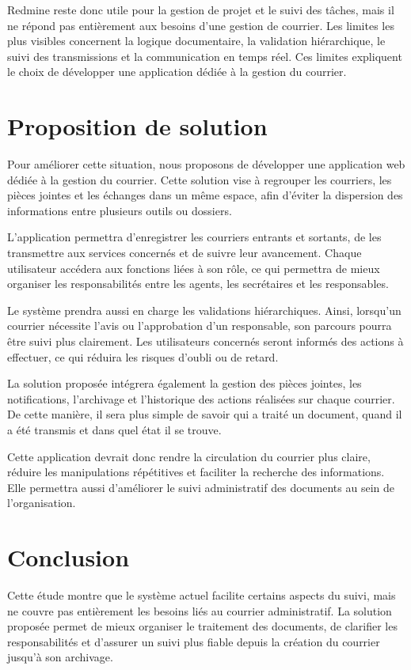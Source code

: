 \documentclass[12pt,a4paper]{report}
\begin{document}
Redmine reste donc utile pour la gestion de projet et le suivi des tâches, mais il ne répond pas entièrement aux besoins d’une gestion de courrier. Les limites les plus visibles concernent la logique documentaire, la validation hiérarchique, le suivi des transmissions et la communication en temps réel. Ces limites expliquent le choix de développer une application dédiée à la gestion du courrier.


\section{Proposition de solution}
\label{sec:proposition_solution}

Pour améliorer cette situation, nous proposons de développer une application web dédiée à la gestion du courrier. Cette solution vise à regrouper les courriers, les pièces jointes et les échanges dans un même espace, afin d’éviter la dispersion des informations entre plusieurs outils ou dossiers.

L’application permettra d’enregistrer les courriers entrants et sortants, de les transmettre aux services concernés et de suivre leur avancement. Chaque utilisateur accédera aux fonctions liées à son rôle, ce qui permettra de mieux organiser les responsabilités entre les agents, les secrétaires et les responsables.

Le système prendra aussi en charge les validations hiérarchiques. Ainsi, lorsqu’un courrier nécessite l’avis ou l’approbation d’un responsable, son parcours pourra être suivi plus clairement. Les utilisateurs concernés seront informés des actions à effectuer, ce qui réduira les risques d’oubli ou de retard.

La solution proposée intégrera également la gestion des pièces jointes, les notifications, l’archivage et l’historique des actions réalisées sur chaque courrier. De cette manière, il sera plus simple de savoir qui a traité un document, quand il a été transmis et dans quel état il se trouve.

Cette application devrait donc rendre la circulation du courrier plus claire, réduire les manipulations répétitives et faciliter la recherche des informations. Elle permettra aussi d’améliorer le suivi administratif des documents au sein de l’organisation.
\section*{Conclusion}

Cette étude montre que le système actuel facilite certains aspects du suivi, mais ne couvre pas entièrement les besoins liés au courrier administratif. La solution proposée permet de mieux organiser le traitement des documents, de clarifier les responsabilités et d'assurer un suivi plus fiable depuis la création du courrier jusqu'à son archivage.


\label{chap:generalitecourrier}






\end{document}
